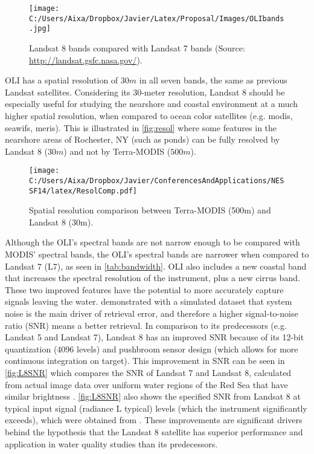 \begin{figure}[htb]
\centering
      \texttt{[image: C:/Users/Aixa/Dropbox/Javier/Latex/Proposal/Images/OLIbands.jpg]}
      \caption{Landsat 8 bands compared with Landsat 7 bands (Source: \protect\url{http://landsat.gsfc.nasa.gov/}).}
      \label{fig:olibands}
\end{figure}

OLI has a spatial resolution of $30m$ in all seven bands, the same as previous Landsat satellites. Considering its 30-meter resolution, Landsat 8 should be especially useful for studying the nearshore and coastal environment at a much higher spatial resolution, when compared to ocean color satellites (e.g. \gls{modis}, \gls{seawifs}, \gls{meris}). This is illustrated in \autoref{fig:resol} where some features in the nearshore areas of Rochester, NY (such as ponds) can be fully resolved by Landsat 8 ($30m$) and not by Terra-MODIS ($500m$).

\begin{figure}[htb]
  \centering
  \texttt{[image: C:/Users/Aixa/Dropbox/Javier/ConferencesAndApplications/NESSF14/latex/ResolComp.pdf]}
  \caption{Spatial resolution comparison between Terra-MODIS (500m) and Landsat 8 (30m). \label{fig:resol} } 
\end{figure}

Although the OLI's spectral bands are not narrow enough to be compared with MODIS' spectral bands, the OLI's spectral bands are narrower when compared to Landsat 7 (L7), as seen in \autoref{tab:bandwidth}. OLI also includes a new coastal band that increases the spectral resolution of the instrument, plus a new cirrus band. These two improved features have the potential to more accurately capture signals leaving the water. \cite{Gerace:2013} demonstrated with a simulated dataset that system noise is the main driver of retrieval error, and therefore a higher signal-to-noise ratio (SNR) means a better retrieval. In comparison to its predecessors (e.g. Landsat 5 and Landsat 7), Landsat 8 has an improved SNR because of its 12-bit quantization (4096 levels) and pushbroom sensor design (which allows for more continuous integration on target). This improvement in SNR can be seen in \autoref{fig:L8SNR} which compares the SNR of Landsat 7 and Landsat 8, calculated from actual image data over uniform water regions of the Red Sea that have similar brightness \cite{Hu:2012}. \autoref{fig:L8SNR} also shows the specified SNR from Landsat 8 at typical input signal (radiance L typical) levels (which the instrument significantly exceeds), which were obtained from \cite{Irons:2012}. These improvements are significant drivers behind the hypothesis that the Landsat 8 satellite has superior performance and application in water quality studies than its predecessors.


